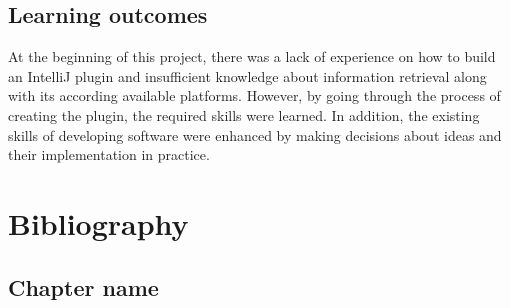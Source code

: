 \documentclass{l4proj}
\begin{document}
\section{Learning outcomes}

At the beginning of this project, there was a lack of experience on how to build an IntelliJ plugin and insufficient knowledge about information retrieval along with its according available platforms. However, by going through the process of creating the plugin, the required skills were learned. In addition, the existing skills of developing software were enhanced by making decisions about ideas and their implementation in practice.

\chapter{Bibliography}

\begin{appendices}

\chapter{Chapter name}
\begin{verbatim}
\end{verbatim}

\end{appendices}




\end{document}

